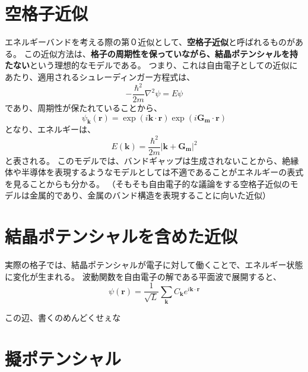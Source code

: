 \documentclass[a4paper]{jsreport}
\begin{document}
        \section{空格子近似}
            エネルギーバンドを考える際の第０近似として、\textbf{空格子近似}と呼ばれるものがある。
            この近似方法は、\textbf{格子の周期性を保っていながら、結晶ポテンシャルを持たない}という理想的なモデルである。
            つまり、これは自由電子としての近似にあたり、適用されるシュレーディンガー方程式は、
            \begin{equation}
                -\frac{\hbar^2}{2m} \nabla^2 \psi = E \psi
            \end{equation}
            であり、周期性が保たれていることから、
            \begin{equation}
                \psi_{\boldsymbol{k}}(\boldsymbol{r}) = \exp(i\boldsymbol{k} \cdot \boldsymbol{r}) \exp(i\boldsymbol{G_m} \cdot \boldsymbol{r})  
            \end{equation}
            となり、エネルギーは、
            \begin{equation}
                E(\boldsymbol{k}) = \frac{\hbar^2}{2m} \left|\boldsymbol{k} + \boldsymbol{G_m} \right| ^2
            \end{equation}
            と表される。
            このモデルでは、バンドギャップは生成されないことから、絶縁体や半導体を表現するようなモデルとしては不適であることがエネルギーの表式を見ることからも分かる。
            （そもそも自由電子的な議論をする空格子近似のモデルは金属的であり、金属のバンド構造を表現することに向いた近似）

        \section{結晶ポテンシャルを含めた近似}
            実際の格子では、結晶ポテンシャルが電子に対して働くことで、エネルギー状態に変化が生まれる。
            波動関数を自由電子の解である平面波で展開すると、
            \begin{equation}
                \psi(\boldsymbol{r}) = \frac{1}{\sqrt{L}} \sum_{\boldsymbol{k}} C_{\boldsymbol{k}} e^{i\boldsymbol{k} \cdot \boldsymbol{r}}
            \end{equation}

            この辺、書くのめんどくせぇな

        \section{擬ポテンシャル}
\end{document}
